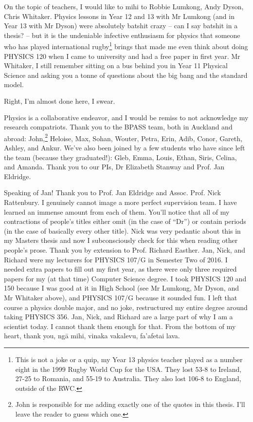 \begin{acknowledgements}
    On the topic of teachers, I would like to mihi to Robbie Lumkong, Andy Dyson, Chris Whitaker. Physics lessons in Year 12 and 13 with Mr Lumkong (and in Year 13 with Mr Dyson) were absolutely batshit crazy -- can I say batshit in a thesis? -- but it is the undeniable infective enthusiasm for physics that someone who has played international rugby\footnote{This is not a joke or a quip, my Year 13 physics teacher played as a number eight in the 1999 Rugby World Cup for the USA. They lost 53-8 to Ireland, 27-25 to Romania, and 55-19 to Australia. They also lost 106-8 to England, outside of the RWC.} brings that made me even think about doing PHYSICS 120 when I came to university and had a free paper in first year. Mr Whitaker, I still remember sitting on a bus behind you in Year 11 Physical Science and asking you a tonne of questions about the big bang and the standard model.

    Right, I'm almost done here, I swear.


    Physics is a collaborative endeavor, and I would be remiss to not acknowledge my research compatriots. Thank you to the BPASS team, both in Auckland and abroad: John,\footnote{John is responsible for me adding exactly one of the quotes in this thesis. I'll leave the reader to guess which one.} Heloise, Max, Sohan, Wouter, Petra, Erin, Adib, Conor, Gareth, Ashley, and Ankur. We've also been joined by a few students who have since left the team (because they graduated!): Gleb, Emma, Louis, Ethan, Siris, Celina, and Amanda.  Thank you to our PIs, Dr Elizabeth Stanway and Prof. Jan Eldridge.

    Speaking of Jan! Thank you to Prof. Jan Eldridge and Assoc. Prof. Nick Rattenbury. I genuinely cannot image a more perfect supervision team. I have learned an immense amount from each of them. You'll notice that all of my contractions of people's titles either omit (in the case of ``Dr'') or contain periods (in the case of basically every other title). Nick was very pedantic about this in my Masters thesis and now I subconsciously check for this when reading other people's prose. Thank you by extension to Prof. Richard Easther. Jan, Nick, and Richard were my lecturers for PHYSICS 107/G in Semester Two of 2016. I needed extra papers to fill out my first year, as there were only three required papers for my (at that time) Computer Science degree. I took PHYSICS 120 and 150 because I was good at it in High School (see Mr Lumkong, Mr Dyson, and Mr Whitaker above), and PHYSICS 107/G because it sounded fun. I left that course a physics double major, and no joke, restructured my entire degree around taking PHYSICS 356. Jan, Nick, and Richard are a large part of why I am a scientist today. I cannot thank them enough for that. From the bottom of my heart, thank you, ng\=a mihi, vinaka vakalevu, fa'afetai lava.


\end{acknowledgements}
